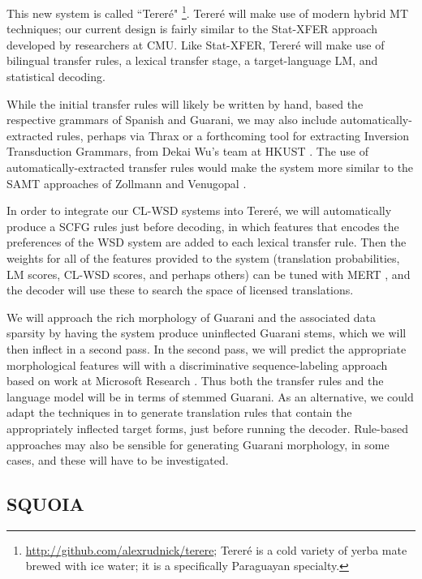 This new system is called ``Tereré"
\footnote{\url{http://github.com/alexrudnick/terere}; 
Tereré is a cold variety of yerba mate brewed with ice water; it is a
specifically Paraguayan specialty.}.
Tereré will make use of modern hybrid MT techniques; our current design is
fairly similar to the Stat-XFER approach \cite{DBLP:conf/cicling/Lavie08}
developed by researchers at CMU.
Like Stat-XFER, Tereré will make use of bilingual transfer rules, a lexical
transfer stage, a target-language LM, and statistical decoding.

While the initial transfer rules will likely be written by hand, based the
respective grammars of Spanish and Guarani, we may also include
automatically-extracted rules, perhaps via Thrax \cite{weese-EtAl:2011:WMT} or
a forthcoming tool for extracting Inversion Transduction Grammars, from Dekai
Wu's team at HKUST \cite{saers-addanki-wu:2013:HyTra}.
The use of automatically-extracted transfer rules would make the system more
similar to the SAMT approaches of Zollmann and Venugopal
.

In order to integrate our CL-WSD systems into Tereré, we will automatically
produce a SCFG rules just before decoding, in which features that encodes the
preferences of the WSD system are added to each lexical transfer rule. Then
the weights for all of the features provided to the system (translation
probabilities, LM scores, CL-WSD scores, and perhaps others) can be tuned with
MERT \cite{och:2003:ACL}, and the decoder will use these to search the space of
licensed translations.

We will approach the rich morphology of Guarani and the associated data
sparsity by having the system produce uninflected Guarani stems, which we will
then inflect in a second pass.
In the second pass, we will predict the appropriate morphological features will
with a discriminative sequence-labeling approach based on work at Microsoft
Research \cite{toutanova-suzuki-ruopp:2008:ACLMain}.
Thus both the transfer rules and the language model will be in terms of stemmed
Guarani.
As an alternative, we could adapt the techniques in
\cite{chahuneau:2013:emnlp} to generate translation rules that contain the
appropriately inflected target forms, just before running the decoder.
Rule-based approaches may also be sensible for generating Guarani morphology,
in some cases, and these will have to be investigated.

\subsection{SQUOIA}

